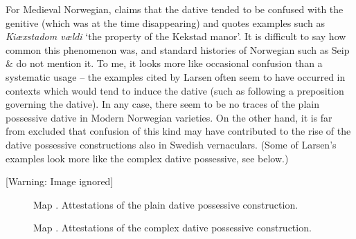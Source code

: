 \begin{styleBodytextC}
For Medieval Norwegian, \citet{Larsen1895} claims that the dative tended to be confused with the genitive (which was at the time disappearing) and quotes examples such as \textit{Kiæxstadom vældi} ‘the property of the Kekstad manor’. It is difficult to say how common this phenomenon was, and standard histories of Norwegian such as Seip \& \citet{Saltveit1971} do not mention it. To me, it looks more like occasional confusion than a systematic usage – the examples cited by Larsen often seem to have occurred in contexts which would tend to induce the dative (such as following a preposition governing the dative). In any case, there seem to be no traces of the plain possessive dative in Modern Norwegian varieties. On the other hand, it is far from excluded that confusion of this kind may have contributed to the rise of the dative possessive constructions also in Swedish vernaculars. (Some of Larsen’s examples look more like the complex dative possessive, see below.)

\end{styleBodytextC}

  [Warning: Image ignored] %
 

\begin{stylecaption}

\end{stylecaption}

\begin{figure}[h]

\begin{minipage}{4.2398in}

\begin{stylecaption}
Map . Attestations of the plain dative possessive construction.

\end{stylecaption}

\end{minipage}

\end{figure}

\begin{stylecaption}
  [Warning: Image ignored] %
 

\end{stylecaption}

\begin{figure}[h]

\begin{minipage}{3.9626in}

\begin{stylecaption}
Map . Attestations of the complex dative possessive construction.

\end{stylecaption}

\end{minipage}

\end{figure}

